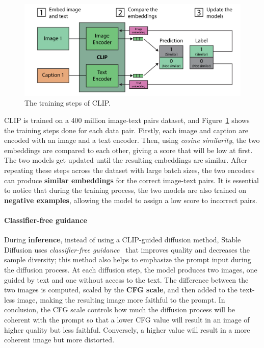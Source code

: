 \documentclass[sn-mathphys,Numbered]{sn-jnl}
\theoremstyle{thmstyleone}%
\theoremstyle{thmstyletwo}%
\theoremstyle{thmstylethree}%
\begin{document}
\begin{figure}[t]
	\centering
    \includegraphics[scale=0.85]{img/svg/Clip.png}
	\caption{The training steps of CLIP.}\label{fig:clip-training}
\end{figure}

CLIP is trained on a 400 million image-text pairs dataset, and Figure~\ref{fig:clip-training} shows the training steps done for each 
data pair.
Firstly, each image and caption are encoded with an image and a text encoder. Then, using \emph{cosine similarity},  the two embeddings are compared to each other, giving a score that will be low at first. 
The two models get updated until the resulting embeddings are similar. 
After repeating these steps across the dataset with large batch sizes, the two encoders can produce \textbf{similar embeddings} 
for the correct image-text pairs. It is essential to notice that during the training process, 
the two models are also trained on \textbf{negative examples}, allowing the model to assign a low score to incorrect pairs.



\paragraph{Classifier-free guidance}

During \textbf{inference}, instead of using a CLIP-guided diffusion method, Stable Diffusion uses 
\emph{classifier-free guidance}~\cite{ho2022classifierfree} that improves quality and decreases the sample diversity;  this method also helps to emphasize the prompt input during the diffusion process. 
At each diffusion step, the model produces two images, one guided by text and one without access to the text.  The difference between the two images is computed, scaled by the \textbf{CFG scale}, and then added to the text-less image,  making the resulting image more faithful to the prompt. 
In conclusion, the CFG scale controls how much the diffusion process will be coherent with the prompt so that a lower CFG value will result in an image of higher quality but less faithful. Conversely, a higher value will result in a more coherent image but more distorted.
\end{document}
